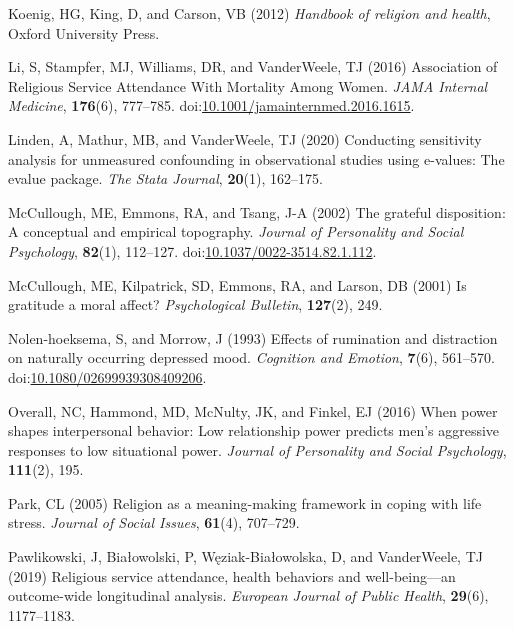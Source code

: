 \documentclass[
  single column]{article}
\newlength{\cslhangindent}
\newenvironment{CSLReferences}[2] %
 {\begin{list}{}{%
  \setlength{\itemindent}{0pt}
  \setlength{\leftmargin}{0pt}
  \setlength{\parsep}{0pt}
  \ifodd #1
   \setlength{\leftmargin}{\cslhangindent}
   \setlength{\itemindent}{-1\cslhangindent}
  \fi
  \setlength{\itemsep}{#2\baselineskip}}}
 {\end{list}}
\begin{document}
\begin{CSLReferences}{1}{0}
Koenig, HG, King, D, and Carson, VB (2012) \emph{Handbook of religion
and health}, Oxford University Press.

Li, S, Stampfer, MJ, Williams, DR, and VanderWeele, TJ (2016)
{Association of Religious Service Attendance With Mortality Among
Women}. \emph{JAMA Internal Medicine}, \textbf{176}(6), 777--785.
doi:\href{https://doi.org/10.1001/jamainternmed.2016.1615}{10.1001/jamainternmed.2016.1615}.

Linden, A, Mathur, MB, and VanderWeele, TJ (2020) Conducting sensitivity
analysis for unmeasured confounding in observational studies using
e-values: The evalue package. \emph{The Stata Journal}, \textbf{20}(1),
162--175.

McCullough, ME, Emmons, RA, and Tsang, J-A (2002) The grateful
disposition: A conceptual and empirical topography. \emph{Journal of
Personality and Social Psychology}, \textbf{82}(1), 112--127.
doi:\href{https://doi.org/10.1037/0022-3514.82.1.112}{10.1037/0022-3514.82.1.112}.

McCullough, ME, Kilpatrick, SD, Emmons, RA, and Larson, DB (2001) Is
gratitude a moral affect? \emph{Psychological Bulletin},
\textbf{127}(2), 249.

Nolen-hoeksema, S, and Morrow, J (1993) Effects of rumination and
distraction on naturally occurring depressed mood. \emph{Cognition and
Emotion}, \textbf{7}(6), 561--570.
doi:\href{https://doi.org/10.1080/02699939308409206}{10.1080/02699939308409206}.

Overall, NC, Hammond, MD, McNulty, JK, and Finkel, EJ (2016) When power
shapes interpersonal behavior: Low relationship power predicts men's
aggressive responses to low situational power. \emph{Journal of
Personality and Social Psychology}, \textbf{111}(2), 195.

Park, CL (2005) Religion as a meaning-making framework in coping with
life stress. \emph{Journal of Social Issues}, \textbf{61}(4), 707--729.

Pawlikowski, J, Białowolski, P, Węziak-Białowolska, D, and VanderWeele,
TJ (2019) Religious service attendance, health behaviors and
well-being---an outcome-wide longitudinal analysis. \emph{European
Journal of Public Health}, \textbf{29}(6), 1177--1183.


\end{CSLReferences}
\end{document}
